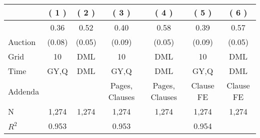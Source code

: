 
\begin{tabular}{lcccccc}
\toprule
 & ( 1 ) & ( 2 ) & ( 3 ) & ( 4 ) & ( 5 ) & ( 6 )\\
\midrule
 & 0.36 & 0.52 & 0.40 & 0.58 & 0.39 & 0.57\\

\multirow{-2}{*}{\raggedright\arraybackslash Auction} & (0.08) & (0.05) & (0.09) & (0.05) & (0.09) & (0.05)\\

\midrule
Grid & 10 & DML & 10 & DML & 10 & DML\\

Time & GY,Q & DML & GY,Q & DML & GY,Q & DML\\

Addenda &  &  & Pages, Clauses & Pages, Clauses & Clause FE & Clause FE\\

N & 1,274 & 1,274 & 1,274 & 1,274 & 1,274 & 1,274\\

$R^2$ & 0.953 &  & 0.953 &  & 0.954 & \\
\bottomrule
\end{tabular}
